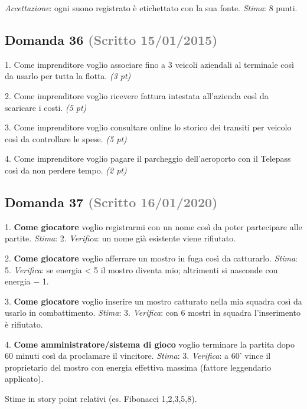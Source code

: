 \documentclass[a4paper,11pt]{article}
\begin{document}
   \textit{Accettazione}: ogni suono registrato è etichettato con la sua fonte. \textit{Stima}: 8 punti.



\subsection*{Domanda 36 \hfill {\small \textcolor{gray}{(Scritto 15/01/2015)}}}
1. Come imprenditore voglio associare fino a 3 veicoli aziendali al terminale così da usarlo per tutta la flotta. \textit{(3 pt)}

2. Come imprenditore voglio ricevere fattura intestata all'azienda così da scaricare i costi. \textit{(5 pt)}

3. Come imprenditore voglio consultare online lo storico dei transiti per veicolo così da controllare le spese. \textit{(5 pt)}

4. Come imprenditore voglio pagare il parcheggio dell'aeroporto con il Telepass così da non perdere tempo. \textit{(2 pt)}



\subsection*{Domanda 37 \hfill {\small \textcolor{gray}{(Scritto 16/01/2020)}}}
1. \textbf{Come giocatore} voglio registrarmi con un nome così da poter partecipare alle partite. \textit{Stima}: 2. \textit{Verifica}: un nome già esistente viene rifiutato.

2. \textbf{Come giocatore} voglio afferrare un mostro in fuga così da catturarlo. \textit{Stima}: 5. \textit{Verifica}: se energia \textless{} 5 il mostro diventa mio; altrimenti si nasconde con energia − 1.

3. \textbf{Come giocatore} voglio inserire un mostro catturato nella mia squadra così da usarlo in combattimento. \textit{Stima}: 3. \textit{Verifica}: con 6 mostri in squadra l'inserimento è rifiutato.

4. \textbf{Come amministratore/sistema di gioco} voglio terminare la partita dopo 60 minuti così da proclamare il vincitore. \textit{Stima}: 3. \textit{Verifica}: a 60' vince il proprietario del mostro con energia effettiva massima (fattore leggendario applicato).

Stime in story point relativi (es. Fibonacci 1,2,3,5,8).



\end{document}
